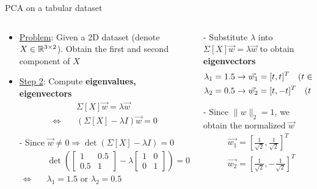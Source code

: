 \begin{frame}{PCA on a tabular dataset}
    \begin{columns}
        \begin{column}{0.7\textwidth}
            \begin{itemize}
                \item \uline{Problem}: Given a 2D dataset (denote $X\in \mathbb{R}^{3\times 2}$). Obtain the first and second component of $X$
                \item \uline{Step 2}: Compute \textbf{eigenvalues, eigenvectors}
                \begin{align*}
                    &\Sigma[X]\vec{w} = \lambda \vec{w}\\
                    \Leftrightarrow \quad&(\Sigma[X] - \lambda I)\vec{w} = 0
                \end{align*}

                - Since $\vec{w} \neq 0 \Rightarrow \det(\Sigma[X] - \lambda I) = 0$
                \begin{align*}
                    &\det\left( \begin{bmatrix}
                        1 & 0.5\\
                        0.5 & 1
                    \end{bmatrix} - \lambda \begin{bmatrix}
                            1 & 0\\
                            0 & 1
                        \end{bmatrix} \right) = 0\\
                    \Leftrightarrow \quad &  \lambda_1 = 1.5 \text{ or } \lambda_2 = 0.5
                \end{align*}
            \end{itemize}
        \end{column}

        \begin{column}{0.3\textwidth}
            - Substitute $\lambda$ into $\Sigma[X]\vec{w} = \lambda\vec{w}$ to obtain \textbf{eigenvectors}
            \begin{align*}
                &\lambda_1 = 1.5 \rightarrow \vec{w_1} = [t, t]^T \quad (t\in \mathbb{R})\\
                &\lambda_2 = 0.5 \rightarrow \vec{w_2} = [t, -t]^T \quad (t\in \mathbb{R})\\
            \end{align*}

            - Since $\|w\|_2 = 1$, we obtain the normalized $\vec{w}$
            \begin{align*}
                &\vec{w_1} = \left[\frac{1}{\sqrt{2}}, \frac{1}{\sqrt{2}}\right]^T\\
                &\vec{w_2} = \left[\frac{1}{\sqrt{2}}, -\frac{1}{\sqrt{2}}\right]^T
            \end{align*}

        \end{column}
    \end{columns}
\end{frame}

